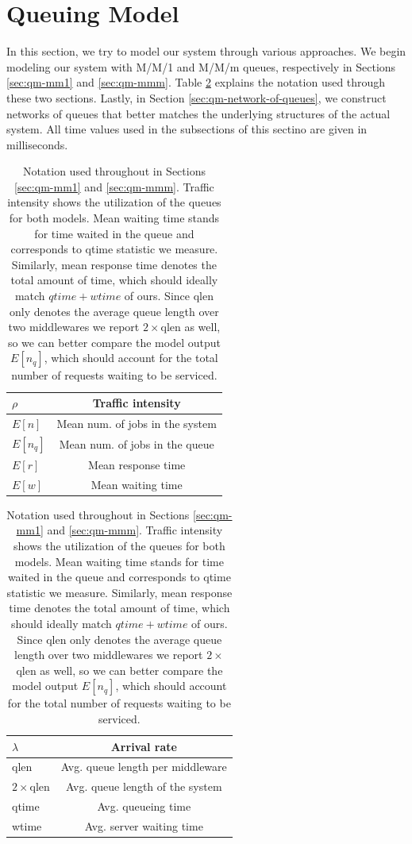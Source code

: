 \documentclass[11pt,a4paper]{article}
\begin{document}
\section{Queuing Model} \label{sec:queueing-model}
In this section, we try to model our system through various approaches. We begin modeling our system with M/M/1 and M/M/m queues, respectively in Sections \ref{sec:qm-mm1} and \ref{sec:qm-mmm}. Table \ref{tab:queueing-notation} explains the notation used through these two sections. Lastly, in Section \ref{sec:qm-network-of-queues}, we construct networks of queues that better matches the underlying structures of the actual system.  All time values used in the subsections of this sectino are given in milliseconds.
\begin{table}[h]
\begin{minipage}{.5\textwidth}
	\centering
	\begin{tabular}{|l|c|}
		\hline $\rho$		& Traffic intensity					\\
		\hline $E[n]$		& Mean num. of jobs in the system	\\
		\hline $E[n_{q}]$	& Mean num. of jobs in the queue 	\\
		\hline $E[r]$		& Mean response time					\\
		\hline $E[w]$		& Mean waiting time					\\
		\hline 
	\end{tabular}
\end{minipage}%
\begin{minipage}{.5\textwidth}
	\centering
	\begin{tabular}{|l|c|}
		\hline $\lambda$		& Arrival rate						\\
		\hline qlen			& Avg. queue length per middleware	\\
		\hline $2\times$qlen	& Avg. queue length of the system	\\
		\hline qtime			& Avg. queueing time					\\
		\hline wtime			& Avg. server waiting time			\\
		\hline 
	\end{tabular}
\end{minipage}
\caption{Notation used throughout in Sections \ref{sec:qm-mm1} and \ref{sec:qm-mmm}. Traffic intensity shows the utilization of the queues for both models. Mean waiting time stands for time waited in the queue and corresponds to qtime statistic we measure. Similarly, mean response time denotes the total amount of time, which should ideally match $qtime + wtime$ of ours. Since qlen only denotes the average queue length over two middlewares we report $2\times$qlen as well, so we can better compare the model output $E[n_{q}]$, which should account for the total number of requests waiting to be serviced.} \label{tab:queueing-notation}
\end{table}	
\end{document}

